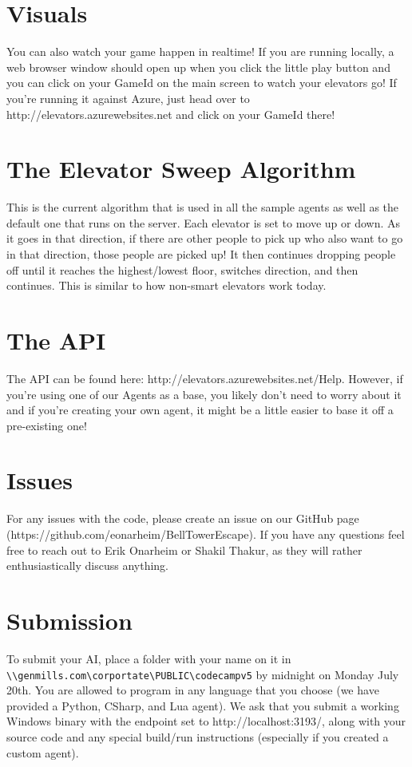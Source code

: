 \documentclass{article}
\begin{document}
\section*{Visuals}
You can also watch your game happen in realtime! If you are running locally, a web browser window should open up when you click the little play button and you can click on your GameId on the main screen to watch your elevators go! If you're running it against Azure, just head over to http://elevators.azurewebsites.net and click on your GameId there!

\newpage
\section*{The Elevator Sweep Algorithm}
This is the current algorithm that is used in all the sample agents as well as the default one that runs on the server. Each elevator is set to move up or down. As it goes in that direction, if there are other people to pick up who also want to go in that direction, those people are picked up! It then continues dropping people off until it reaches the highest/lowest floor, switches direction, and then continues. This is similar to how non-smart elevators work today.

\section*{The API}
The API can be found here: http://elevators.azurewebsites.net/Help. However, if you're using one of our Agents as a base, you likely don't need to worry about it and if you're creating your own agent, it might be a little easier to base it off a pre-existing one!

\section*{Issues}
For any issues with the code, please create an issue on our GitHub page (https://github.com/eonarheim/BellTowerEscape). If you have any questions feel free to reach out to Erik Onarheim or Shakil Thakur, as they will rather enthusiastically discuss anything.

\section*{Submission}
To submit your AI, place a folder with your name on it in \verb|\\genmills.com\corportate\PUBLIC\codecampv5| by midnight on Monday July 20th. You are allowed to program in any language that you choose (we have provided a Python, CSharp, and Lua agent). We ask that you submit a working Windows binary with the endpoint set to http://localhost:3193/, along with your source code and any special build/run instructions (especially if you created a custom agent).
\end{document}
